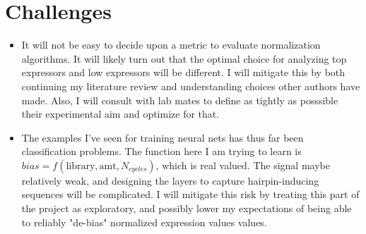 \documentclass[dvips,12pt]{article}
\begin{document}
\section{Challenges}

\begin{itemize}
	\item{It will not be easy to decide upon a metric to evaluate normalization algorithms. It will likely turn out that the optimal choice for analyzing top expressors and low expressors will be different. I will mitigate this by both continuing my literature review and understanding choices other authors have made. Also, I will consult with lab mates to define as tightly as posssible their  experimental aim and optimize for that.}
	\item{The examples I've seen for training neural nets has thus far been classification problems. The function here I am trying to learn is $bias = f(\text{library},\text{amt}, N_{cycles})$, which is real valued. The signal maybe relatively weak, and designing the layers to capture hairpin-inducing sequences will be complicated. I will mitigate this risk by treating this part of the project as  exploratory, and possibly lower my expectations of being able to reliably "de-bias" normalized expression values values.}
\end{itemize}



%
%

%
\end{document}

